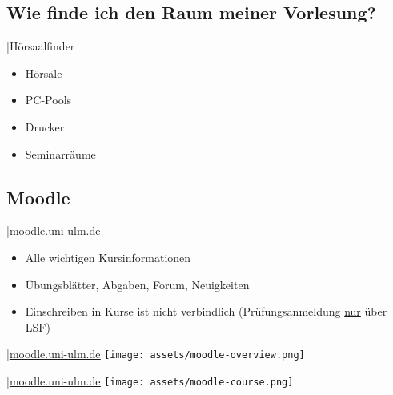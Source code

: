 \documentclass[
	aspectratio=169, 
	10pt 
]{beamer}
\begin{document}
\subsection{Wie finde ich den Raum meiner Vorlesung?}
\begin{frame}{\insertsubsection \space|\space Hörsaalfinder}
    \begin{fancycolumns}[widths={30}]
        
        \nextcolumn
        \centering
        \begin{minipage}[C]{0.8\textwidth}
            \begin{itemize}
                \item Hörsäle
                \item PC-Pools
                \item Drucker 
                \item Seminarräume 
            \end{itemize}
        \end{minipage}
    \end{fancycolumns}
\end{frame}

\subsection{Moodle}
\begin{frame}{\insertsubsection \space|\space\underline{\href{https://moodle.uni-ulm.de}{moodle.uni-ulm.de}}}
    \begin{itemize}
        \item Alle wichtigen Kursinformationen 
        \item Übungsblätter, Abgaben, Forum, Neuigkeiten
        \item Einschreiben in Kurse ist nicht verbindlich (Prüfungsanmeldung \underline{nur} über LSF)
    \end{itemize}
\end{frame}

\begin{frame}{\insertsubsection \space|\space\underline{\href{https://moodle.uni-ulm.de}{moodle.uni-ulm.de}}}
    \texttt{[image: assets/moodle-overview.png]}
\end{frame}

\begin{frame}{\insertsubsection \space|\space\underline{\href{https://moodle.uni-ulm.de}{moodle.uni-ulm.de}}}
    \texttt{[image: assets/moodle-course.png]}
\end{frame}
\end{document}
